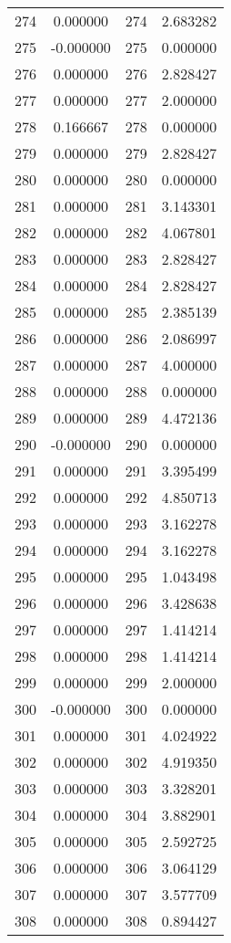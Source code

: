 \documentclass[12pt]{article}
\begin{document}
\begin{longtable}{@{}cccc@{}}
274 & 0.000000 & 274 & 2.683282 \\
275 & -0.000000 & 275 & 0.000000 \\
276 & 0.000000 & 276 & 2.828427 \\
277 & 0.000000 & 277 & 2.000000 \\
278 & 0.166667 & 278 & 0.000000 \\
279 & 0.000000 & 279 & 2.828427 \\
280 & 0.000000 & 280 & 0.000000 \\
281 & 0.000000 & 281 & 3.143301 \\
282 & 0.000000 & 282 & 4.067801 \\
283 & 0.000000 & 283 & 2.828427 \\
284 & 0.000000 & 284 & 2.828427 \\
285 & 0.000000 & 285 & 2.385139 \\
286 & 0.000000 & 286 & 2.086997 \\
287 & 0.000000 & 287 & 4.000000 \\
288 & 0.000000 & 288 & 0.000000 \\
289 & 0.000000 & 289 & 4.472136 \\
290 & -0.000000 & 290 & 0.000000 \\
291 & 0.000000 & 291 & 3.395499 \\
292 & 0.000000 & 292 & 4.850713 \\
293 & 0.000000 & 293 & 3.162278 \\
294 & 0.000000 & 294 & 3.162278 \\
295 & 0.000000 & 295 & 1.043498 \\
296 & 0.000000 & 296 & 3.428638 \\
297 & 0.000000 & 297 & 1.414214 \\
298 & 0.000000 & 298 & 1.414214 \\
299 & 0.000000 & 299 & 2.000000 \\
300 & -0.000000 & 300 & 0.000000 \\
301 & 0.000000 & 301 & 4.024922 \\
302 & 0.000000 & 302 & 4.919350 \\
303 & 0.000000 & 303 & 3.328201 \\
304 & 0.000000 & 304 & 3.882901 \\
305 & 0.000000 & 305 & 2.592725 \\
306 & 0.000000 & 306 & 3.064129 \\
307 & 0.000000 & 307 & 3.577709 \\
308 & 0.000000 & 308 & 0.894427 \\

\end{longtable}
\end{document}
